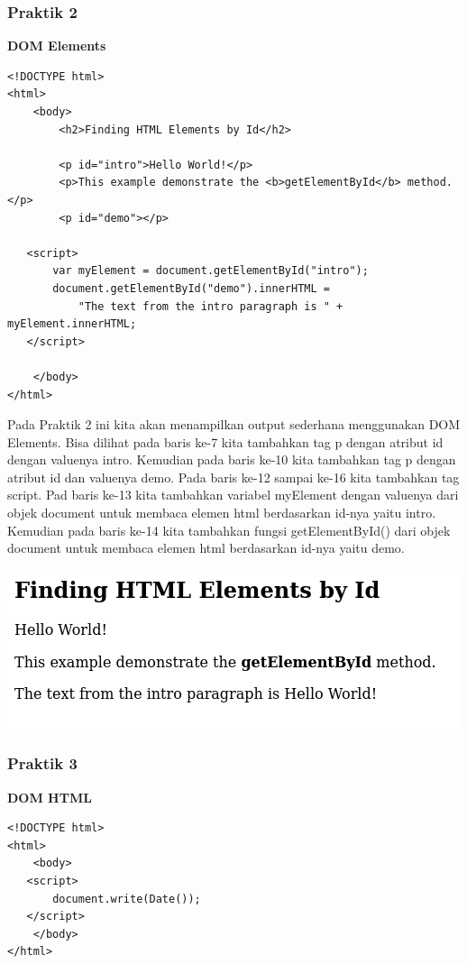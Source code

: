 \documentclass[a4paper,12pt]{article}
\begin{document}
\subsubsection{Praktik 2}
\textbf{DOM Elements}
\begin{lstlisting}
<!DOCTYPE html>
<html>
    <body>
        <h2>Finding HTML Elements by Id</h2>

        <p id="intro">Hello World!</p>
        <p>This example demonstrate the <b>getElementById</b> method.</p>
        <p id="demo"></p>

   <script>
       var myElement = document.getElementById("intro");
       document.getElementById("demo").innerHTML = 
           "The text from the intro paragraph is " + myElement.innerHTML;
   </script>

    </body>
</html>
\end{lstlisting}
Pada Praktik 2 ini kita akan menampilkan output sederhana menggunakan DOM Elements. Bisa dilihat pada baris ke-7 kita
tambahkan tag p dengan atribut id dengan valuenya intro. Kemudian pada baris ke-10 kita tambahkan tag p dengan atribut
id dan valuenya demo. Pada baris ke-12 sampai ke-16 kita tambahkan tag script. Pad baris ke-13 kita tambahkan variabel
myElement dengan valuenya dari objek document untuk membaca elemen html berdasarkan id-nya yaitu intro. Kemudian pada
baris ke-14 kita tambahkan fungsi getElementById() dari objek document untuk membaca elemen html berdasarkan id-nya
yaitu demo.

\begin{center}
    \includegraphics[scale=.7]{2.png} 
\end{center}

\subsubsection{Praktik 3}
\textbf{DOM HTML}
\begin{lstlisting}
<!DOCTYPE html>
<html>
    <body>
   <script>
       document.write(Date());
   </script>
    </body>
</html>

\end{lstlisting}
\end{document}
